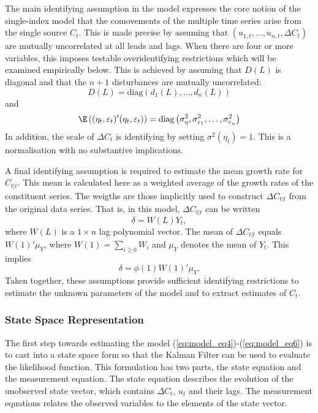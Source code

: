 The main identifying assumption in the model expresses the core notion of the single-index model that the comovements of the multiple time series arise from the single source $C_t$. This is made precise by assuming that $\left(u_{1,t},\ldots, u_{n,t}, \Delta C_t\right)$ are mutually uncorrelated at all leads and lags. When there are four or more variables, this imposes testable overidentifying restrictions which will be examined empirically below. This is achieved by assuming that $D(L)$ is diagonal and that the $n+1$ disturbances are mutually uncorrelated:
\begin{equation}
	D(L) = \text{diag}\left(d_1(L), \ldots, d_n(L)\right)
\end{equation}
and
\begin{equation}
	\E\left((\eta_t, \varepsilon_t)'(\eta_t,\varepsilon_t)\right) = \text{diag}\left(\sigma_\eta^2, \sigma^2_{\varepsilon_1},\ldots, \sigma^2_{\varepsilon_n}\right)
\end{equation}
In addition, the scale of $\Delta C_t$ is identifying by setting $\sigma^2(\eta_t)=1$. This is a normalisation with no substantive implications.

A final identifying assumption is required to estimate the mean growth rate for $C_{t|t}$. This mean is calculated here as a weighted average of the growth rates of the constituent series. The weigths are those implicitly used to construct $\Delta C_{t|t}$ from the original data series. That is, in this model, $\Delta C_{t|t}$ can be written 
\begin{equation}
	\delta = W(L) Y_t,
\end{equation}
where $W(L)$ is a $1\times n$ lag polynomial vector. The mean of $\Delta C_{t|t}$ equals $W(1)'\mu_Y$, where $W(1) = \sum_{i\geq 0}W_i$ and $\mu_Y$ denotes the mean of $Y_t$. This implies 
\begin{equation}
	\delta = \phi(1) W(1)'\mu_Y.
\end{equation}
Taken together, these assumptions provide sufficient identifying restrictions to estimate the unknown parameters of the model and to extract estimates of $C_t$.

\subsubsection{State Space Representation}

The first step towards estimating the model (\ref{eq:model_eq4})-(\ref{eq:model_eq6}) is to cast into a state space form so that the Kalman Filter can be used to evaluate the likelihood function. This formulation has two parts, the state equation and the measurement equation. The state equation describes the evolution of the unobserved state vector, which contains $\Delta C_t$, $u_t$ and their lags. The measurement equations relates the observed variables to the elements of the state vector. 

